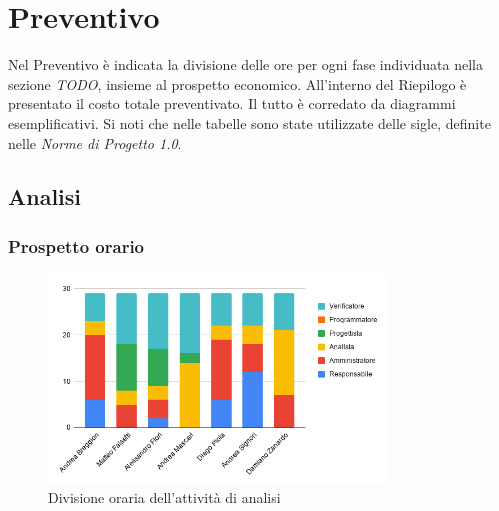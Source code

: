 \section{Preventivo}
Nel Preventivo è indicata la divisione delle ore per ogni fase individuata nella sezione \textit{TODO}, insieme al prospetto economico. All'interno del Riepilogo è presentato il costo totale preventivato. Il tutto è corredato da diagrammi esemplificativi.
Si noti che nelle tabelle sono state utilizzate delle sigle, definite nelle \textit{Norme di Progetto 1.0}. %
\subsection{Analisi}

    \subsubsection{Prospetto orario}
    \def\hourlycontent{
        {Andrea Breggion,6,14,3,0,0,6,29},
        {Matteo Falsetti,0,5,3,10,0,11,29},
        {Alessandro Flori,2,4,3,8,0,12,29},
        {Andrea Mascari,0,0,14,2,0,13,29},
        {Diego Piola,6,13,3,0,0,7,29},
        {Andrea Signori,12,6,4,0,0,7,29},
        {Damiano Zanardo,0,7,14,0,0,8,29},
        {Ore totali, 25, 51, 44, 19, 0, 64, 203},
    }
    
    \begin{figure}[H]
        \centering
        \includegraphics[width=0.8\textwidth]{source/img/analisi_orari.png}
        \caption{Divisione oraria dell'attività di analisi}
    \end{figure}
